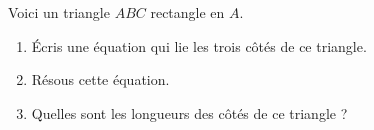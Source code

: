 %
%
    Voici un triangle $ABC$ rectangle en $A$.
    \begin{center}
        
    \end{center}
    \begin{enumerate}
        \item Écris une équation qui lie les trois côtés de ce triangle.
        \item Résous cette équation.
        \item Quelles sont les longueurs des côtés de ce triangle ?
    \end{enumerate}
